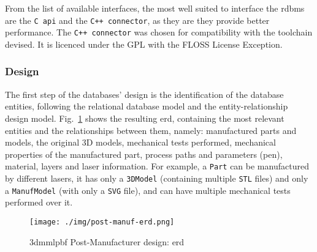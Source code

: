 From the list of available interfaces, the most well suited to interface the
\gls{rdbms} are the \texttt{C \gls{api}} and the \texttt{C++ connector}, as they
are they provide better performance.
The \texttt{C++ connector} was chosen for compatibility with the toolchain
devised. It is licenced under the GPL with the FLOSS License Exception.


\subsubsection{Design}%
\label{sec:post-manuf-design}
The first step of the databases' design is the identification of the database
entities, following the relational database model and the entity-relationship
design model.
Fig.~\ref{fig:post-manuf-erd} shows the resulting \gls{erd},
containing the most relevant entities and the relationships between them, namely: manufactured parts and models,
the original 3D models, mechanical tests performed, mechanical properties of the
manufactured part, process paths and parameters (pen), material, layers and
laser information. For example, a \texttt{Part} can be manufactured by different
lasers, it has only a \texttt{3DModel} (containing multiple \texttt{STL} files)
and only a \texttt{ManufModel} (with only a \texttt{SVG} file), and can have
multiple mechanical tests performed over it.
%
\begin{figure}[!hbt]
  \centering
    \texttt{[image: ./img/post-manuf-erd.png]}
  \caption{\gls{3dmmlpbf} Post-Manufacturer design: \gls{erd}}%
  \label{fig:post-manuf-erd}
\end{figure}

